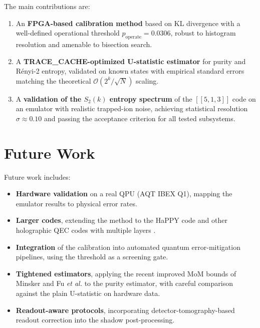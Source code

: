 \documentclass[12pt,a4paper,oneside]{book}
\theoremstyle{plain}
\theoremstyle{definition}
\theoremstyle{remark}
\begin{document}
The main contributions are:
\begin{enumerate}
    \item An \textbf{FPGA-based calibration method} based on KL divergence with a well-defined operational threshold $p_{\text{operate}} = 0.0306$, robust to histogram resolution and amenable to bisection search.
    \item A \textbf{TRACE\_CACHE-optimized U-statistic estimator} for purity and R\'enyi-2 entropy, validated on known states with empirical standard errors matching the theoretical $\mathcal{O}(2^k/\sqrt{N})$ scaling.
    \item A \textbf{validation of the $S_2(k)$ entropy spectrum} of the $[[5,1,3]]$ code on an emulator with realistic trapped-ion noise, achieving statistical resolution $\sigma \approx 0.10$ and passing the acceptance criterion for all tested subsystems.
\end{enumerate}

\section{Future Work}
\label{sec:conc_future}

Future work includes:
\begin{itemize}[itemsep=2pt]
    \item \textbf{Hardware validation} on a real QPU (AQT IBEX Q1), mapping the emulator results to physical error rates.
    \item \textbf{Larger codes}, extending the method to the HaPPY code and other holographic QEC codes with multiple layers \cite{pastawski2015holographic}.
    \item \textbf{Integration} of the calibration into automated quantum error-mitigation pipelines, using the threshold as a screening gate.
    \item \textbf{Tightened estimators}, applying the recent improved MoM bounds of Minsker \cite{minsker2023efficient} and Fu \textit{et al.} \cite{fu2025classical} to the purity estimator, with careful comparison against the plain U-statistic on hardware data.
    \item \textbf{Readout-aware protocols}, incorporating detector-tomography-based readout correction \cite{maciejewski2020mitigation} into the shadow post-processing.
\end{itemize}

\appendix
\end{document}
